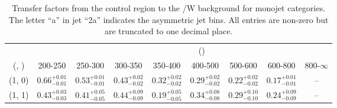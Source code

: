 \begin{table}[h!]
\tiny
\centering
\caption{Transfer factors from the \mj control region to the \ttbar/W background for monojet categories. The letter ``a'' in jet \eg ``2a''  indicates the asymmetric jet bins. All entries are non-zero but are truncated to one decimal place.\label{tab:tf_mu_ttw_mono}}
\begin{tabular}
{ccccccccc}
	\hline\hline
&	& \multicolumn{8}{c}{\scalht (\gev)} \\ 
	 (\njet,  \nb) & 200-250 & 250-300 & 300-350 & 350-400 & 400-500 & 500-600 & 600-800 & 800-$\infty$ \\ [0.8ex] 
\hline
	(1, 0) & $0.66^{+ 0.01 }_{- 0.01 }$ & $0.53^{+ 0.01 }_{- 0.01 }$ & $0.43^{+ 0.02 }_{- 0.02 }$ & $0.32^{+ 0.02 }_{- 0.02 }$ & $0.29^{+ 0.02 }_{- 0.02 }$ & $0.22^{+ 0.02 }_{- 0.02 }$ & $0.17^{+ 0.01 }_{- 0.01 }$ & -- \\[0.5ex] 
	(1, 1) & $0.43^{+ 0.03 }_{- 0.03 }$ & $0.41^{+ 0.05 }_{- 0.05 }$ & $0.44^{+ 0.09 }_{- 0.09 }$ & $0.19^{+ 0.05 }_{- 0.05 }$ & $0.34^{+ 0.08 }_{- 0.08 }$ & $0.29^{+ 0.10 }_{- 0.10 }$ & $0.24^{+ 0.09 }_{- 0.09 }$ & -- \\[0.5ex] 
	\hline
	\hline
\end{tabular}
\end{table}
